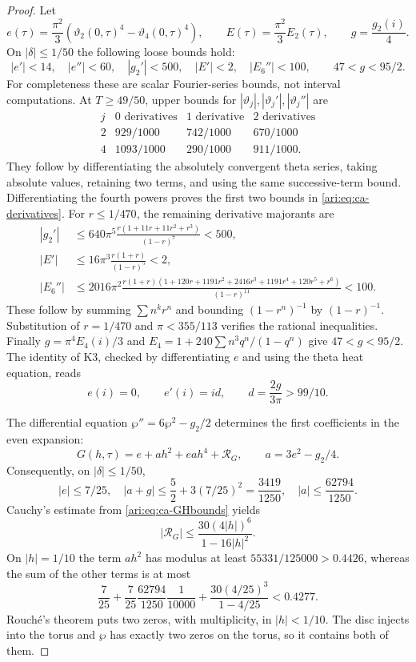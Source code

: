 \begin{proof}
Let
\[
 e(\tau)=\frac{\pi^2}{3}(\vartheta_2(0,\tau)^4-
                              \vartheta_4(0,\tau)^4),\qquad
 E(\tau)=\frac{\pi^2}{3}E_2(\tau),\qquad
 g=\frac{g_2(i)}4.
\]
On $|\delta|\le1/50$ the following loose bounds hold:
\begin{equation}\label{ari:eq:ca-derivatives}
 |e'|<14,\quad |e''|<60,\quad |g_2'|<500,
 \quad |E'|<2,\quad |E_6''|<100,
 \qquad 47<g<95/2.
\end{equation}
For completeness these are scalar Fourier-series bounds, not
interval computations. At $T\ge49/50$, upper bounds for
$|\vartheta_j|,|\vartheta_j'|,|\vartheta_j''|$ are
\[
\begin{array}{c|ccc}
j&0\text{ derivatives}&1\text{ derivative}&2\text{ derivatives}\\ \hline
2&929/1000&742/1000&670/1000\\
4&1093/1000&290/1000&911/1000.
\end{array}
\]
They follow by differentiating the absolutely convergent theta
series, taking absolute values, retaining two terms, and using
the same successive-term bound. Differentiating the fourth
powers proves the first two bounds in \eqref{ari:eq:ca-derivatives}.
For $r\le1/470$, the remaining derivative majorants are
\begin{align*}
 |g_2'|&\le640\pi^5\frac{r(1+11r+11r^2+r^3)}{(1-r)^7}<500,\\
 |E'|&\le16\pi^3\frac{r(1+r)}{(1-r)^5}<2,\\
 |E_6''|&\le2016\pi^2
 \frac{r(1+r)(1+120r+1191r^2+2416r^3+1191r^4+120r^5+r^6)}
 {(1-r)^{11}}<100.
\end{align*}
These follow by summing $\sum n^k r^n$ and bounding
$(1-r^n)^{-1}$ by $(1-r)^{-1}$. Substitution of $r=1/470$
and $\pi<355/113$ verifies the rational inequalities.
Finally $g=\pi^4E_4(i)/3$ and
$E_4=1+240\sum n^3q^n/(1-q^n)$ give $47<g<95/2$.
The identity of K3, checked by differentiating $e$ and using
the theta heat equation, reads
\[
 e(i)=0,\qquad e'(i)=id,\qquad d=\frac{2g}{3\pi}>99/10.
\]

The differential equation $\wp''=6\wp^2-g_2/2$ determines the
first coefficients in the even expansion:
\[
 G(h,\tau)=e+a h^2+ea h^4+\mathcal R_G,
 \qquad a=3e^2-g_2/4.
\]
Consequently, on $|\delta|\le1/50$,
\[
 |e|\le7/25,\quad |a+g|\le\frac52+3(7/25)^2=\frac{3419}{1250},
 \quad |a|\le\frac{62794}{1250}.
\]
Cauchy's estimate from \eqref{ari:eq:ca-GHbounds} yields
\[
 |\mathcal R_G|\le
 \frac{30(4|h|)^6}{1-16|h|^2}.
\]
On $|h|=1/10$ the term $ah^2$ has modulus at least
$55331/125000>0.4426$, whereas the sum of the other terms is at most
\[
 \frac7{25}+\frac7{25}\frac{62794}{1250}\frac1{10000}
       +\frac{30(4/25)^3}{1-4/25}<0.4277.
\]
Rouch\'e's theorem puts two zeros, with multiplicity, in
$|h|<1/10$. The disc injects into the torus and $\wp$ has exactly
two zeros on the torus, so it contains both of them.


\end{proof}
